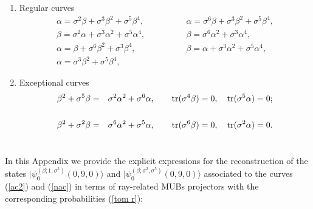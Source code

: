 \documentclass[quantumrep,article,submit,pdftex,moreauthors]{Definitions/mdpi}
\DeclareMathOperator{\tr}{tr}
\begin{document}
\begin{enumerate}

  \item Regular curves 
    \begin{equation}
      \begin{array}{ll}
        \alpha = \sigma^{2}\beta + \sigma^{3}\beta^{2} + \sigma^{5}\beta^{4},
        \qquad\qquad
        & \alpha = \sigma^{6}\beta + \sigma^{3}\beta^{2} + \sigma^{5}\beta^{4},
        \\[5pt] 
        \beta = \sigma^{2}\alpha + \sigma^{3}\alpha^{2} + \sigma^{5}\alpha^{4},
        \qquad\qquad
        & \beta = \sigma^{6}\alpha^{2} + \sigma^{3}\alpha^{4}, \\[5pt] 
        \alpha = \beta + \sigma^{6}\beta^{2} + \sigma^{3}\beta^{4},
        \qquad\qquad
        & \beta = \alpha + \sigma^{3}\alpha^{2} + \sigma^{5}\alpha^{4}, \\[5pt] 
        \alpha = \sigma^{3}\beta^{2} + \sigma^{5}\beta^{4},
        \qquad\qquad
        & 
      \end{array}%
    \end{equation}

  \item Exceptional curves 
    \begin{eqnarray}
      \beta ^{2}+\sigma ^{5}\beta
      &=& \sigma ^{2}\alpha ^{2}+\sigma ^{6}\alpha,
      \qquad \tr(\sigma ^{4}\beta )=0,\quad \tr(\sigma ^{5}\alpha ) = 0;
      \notag \\
      && \\
      \beta^{2}+\sigma ^{2}\beta
      &=& \sigma^{6}\alpha^{2} + \sigma^{5}\alpha,
      \qquad \tr(\sigma^{6}\beta) = 0,
      \quad \tr(\sigma ^{2}\alpha ) = 0.
      \notag
    \end{eqnarray}
\end{enumerate}

\section[\appendixname~\thesection]{}
\label{appC}

\color{teal}

In this Appendix we provide the explicit expressions for the reconstruction of
the states $|\psi_{0}^{(\beta;1,\sigma^{5})}(0,9,0)\rangle$ and
$|\psi_{0}^{(\beta ;\sigma^{2},\sigma^{5})}(0,9,0)\rangle$ associated to the
curves (\ref{ac2}) and (\ref{nac}) in terms of ray-related MUBs projectors with
the corresponding probabilities (\ref{tom r}):
\end{document}
